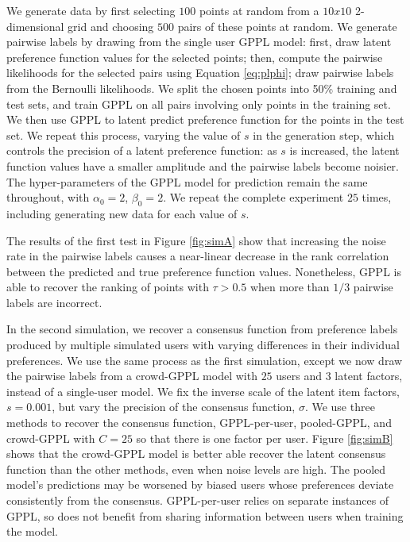 We generate data by first selecting $100$ points at random
from a $10x10$ 2-dimensional grid and choosing $500$ pairs of these points at random. 
We generate pairwise labels by drawing from the single user GPPL model:
first, draw latent preference function values for the selected points; 
then, compute the pairwise likelihoods for the selected pairs using Equation \ref{eq:plphi};
draw pairwise labels from the Bernoulli likelihoods. 
We split the chosen points into 50\% training and test sets, and
train GPPL on all pairs involving only points in the training set.
We then use GPPL to latent predict preference function for the points in the test set.
We repeat this process, varying the value of $s$ in the generation step, 
which controls the precision of a latent preference function: as $s$ is increased, the latent
function values have a smaller amplitude and the pairwise labels become noisier.
The hyper-parameters of the GPPL model for prediction remain the same throughout, 
with $\alpha_0 = 2$, $\beta_0 = 2$.
We repeat the complete experiment $25$ times, including generating new data for each value of $s$.

The results of the first test in Figure \ref{fig:simA} show that increasing
the noise rate in the pairwise labels causes a near-linear decrease in the
rank correlation between the predicted and true preference function values. 
Nonetheless, GPPL is able to recover the ranking of points with $\tau > 0.5$ when
more than $1/3$ pairwise labels are incorrect.

In the second simulation, we recover a consensus function
from preference labels produced by multiple simulated users with varying differences
in their individual preferences. We use the same process as the first simulation, except
we now draw the pairwise labels from a crowd-GPPL model with $25$ users and $3$ latent factors,
instead of a single-user model. We fix the inverse scale of the latent item factors, $s=0.001$,
but vary the precision of the consensus function, $\sigma$. 
We use three methods to recover the consensus function, GPPL-per-user, pooled-GPPL, 
and crowd-GPPL with $C=25$ so that there is one factor per user. 
Figure \ref{fig:simB} shows that the crowd-GPPL model is better able recover the latent consensus
function than the other methods, even when noise levels are high. 
The pooled model's predictions may be worsened by biased users whose preferences deviate
 consistently from the consensus. GPPL-per-user relies on separate instances of GPPL, so 
 does not benefit from sharing information between users when training the model.

